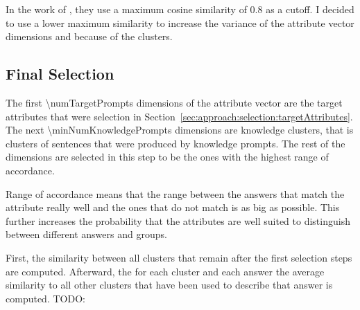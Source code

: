 In the work of \citeauthor{patelLearningInterpretableStyle2023}, they use a maximum cosine similarity of \num{0.8} as a cutoff. I decided to use a lower maximum similarity to increase the variance of the attribute vector dimensions and because of the clusters. %

\subsection{Final Selection} %
\label{sec:approach:selection:finalSelection}
The first \num{\numTargetPrompts} dimensions of the attribute vector are the target attributes that were selection in Section~\ref{sec:approach:selection:targetAttributes}. The next \num{\minNumKnowledgePrompts} dimensions are knowledge clusters, that is clusters of sentences that were produced by knowledge prompts. The rest of the dimensions are selected in this step to be the ones with the highest range of accordance. %

Range of accordance means that the range between the answers that match the attribute really well and the ones that do not match is as big as possible. This further increases the probability that the attributes are well suited to distinguish between different answers and groups.

First, the similarity between all clusters that remain after the first selection steps are computed. Afterward, the for each cluster and each answer the average similarity to all other clusters that have been used to describe that answer is computed. TODO:




